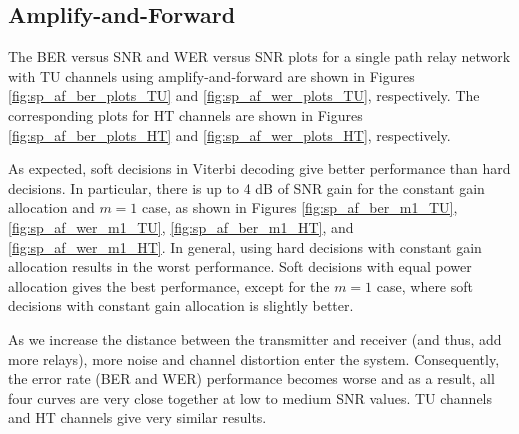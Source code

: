 \subsection{Amplify-and-Forward}
\label{subsec:sp_bws_af}

The BER versus SNR and WER versus SNR plots for a single path relay network with TU channels using amplify-and-forward are shown in Figures \ref{fig:sp_af_ber_plots_TU} and \ref{fig:sp_af_wer_plots_TU}, respectively.  The corresponding plots for HT channels are shown in Figures \ref{fig:sp_af_ber_plots_HT} and \ref{fig:sp_af_wer_plots_HT}, respectively.

As expected, soft decisions in Viterbi decoding give better performance than hard decisions.  In particular, there is up to 4 dB of SNR gain for the constant gain allocation and $m=1$ case, as shown in Figures \ref{fig:sp_af_ber_m1_TU}, \ref{fig:sp_af_wer_m1_TU}, \ref{fig:sp_af_ber_m1_HT}, and \ref{fig:sp_af_wer_m1_HT}.  In general, using hard decisions with constant gain allocation results in the worst performance.  Soft decisions with equal power allocation gives the best performance, except for the $m=1$ case, where soft decisions with constant gain allocation is slightly better.  

As we increase the distance between the transmitter and receiver (and thus, add more relays), more noise and channel distortion enter the system.  Consequently, the error rate (BER and WER) performance becomes worse and as a result, all four curves are very close together at low to medium SNR values.  TU channels and HT channels give very similar results.

